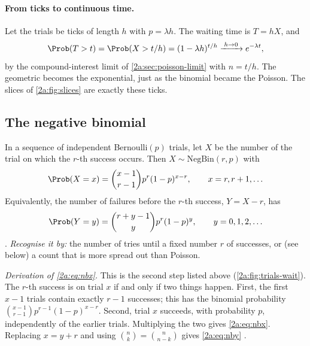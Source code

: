 \paragraph{From ticks to continuous time.} Let the trials be ticks of length $h$ with $p=\lambda h$. The waiting time is $T=hX$, and
\[
  \Prob(T>t)=\Prob(X>t/h)=(1-\lambda h)^{t/h}\xrightarrow{\;h\to0\;}e^{-\lambda t},
\]
by the compound-interest limit of \cref{2a:sec:poisson-limit} with $n=t/h$. The geometric becomes the exponential, just as the binomial became the Poisson. The slices of \cref{2a:fig:slices} are exactly these ticks.

\subsection{The negative binomial}

\begin{workdef}
In a sequence of independent Bernoulli$(p)$ trials, let $X$ be the number of the trial on which the $r$-th success occurs. Then $X\sim\mathrm{NegBin}(r,p)$ with
\begin{equation}
  \Prob(X=x)=\binom{x-1}{r-1}p^r(1-p)^{x-r},\qquad x=r,r+1,\dots \label{2a:eq:nbx}
\end{equation}
Equivalently, the number of failures before the $r$-th success, $Y=X-r$, has
\begin{equation}
  \Prob(Y=y)=\binom{r+y-1}{y}p^r(1-p)^y,\qquad y=0,1,2,\dots \label{2a:eq:nby}
\end{equation}
.
\emph{Recognise it by:} the number of tries until a fixed number $r$ of successes, or (see below) a count that is more spread out than Poisson.
\end{workdef}

\emph{Derivation of \eqref{2a:eq:nbx}.} This is the second step listed above (\cref{2a:fig:trials-wait}). The $r$-th success is on trial $x$ if and only if two things happen. First, the first $x-1$ trials contain exactly $r-1$ successes; this has the binomial probability $\binom{x-1}{r-1}p^{r-1}(1-p)^{x-r}$. Second, trial $x$ succeeds, with probability $p$, independently of the earlier trials. Multiplying the two gives \eqref{2a:eq:nbx}. Replacing $x=y+r$ and using $\binom{n}{k}=\binom{n}{n-k}$ gives \eqref{2a:eq:nby} .

